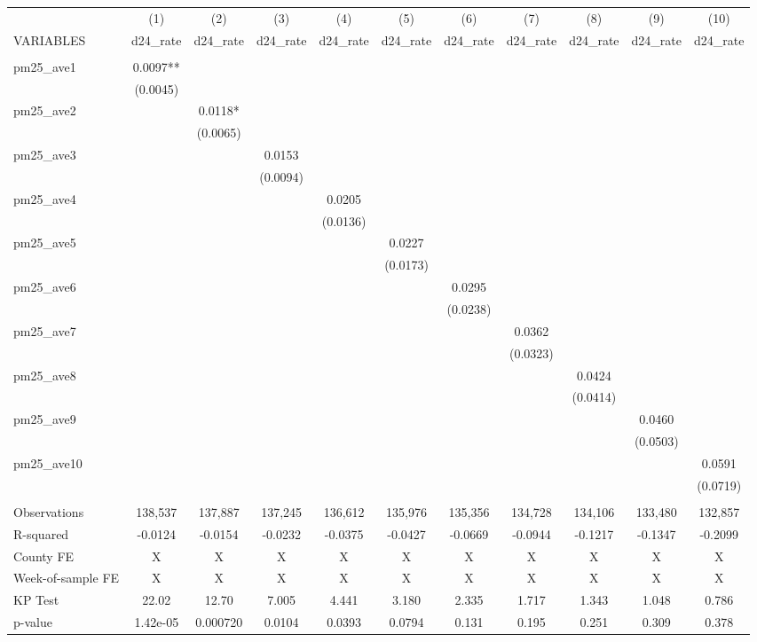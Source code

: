 \begin{tabular}{lcccccccccc} \hline
 & (1) & (2) & (3) & (4) & (5) & (6) & (7) & (8) & (9) & (10) \\
VARIABLES & d24\_rate & d24\_rate & d24\_rate & d24\_rate & d24\_rate & d24\_rate & d24\_rate & d24\_rate & d24\_rate & d24\_rate \\ \hline
 &  &  &  &  &  &  &  &  &  &  \\
pm25\_ave1 & 0.0097** &  &  &  &  &  &  &  &  &  \\
 & (0.0045) &  &  &  &  &  &  &  &  &  \\
pm25\_ave2 &  & 0.0118* &  &  &  &  &  &  &  &  \\
 &  & (0.0065) &  &  &  &  &  &  &  &  \\
pm25\_ave3 &  &  & 0.0153 &  &  &  &  &  &  &  \\
 &  &  & (0.0094) &  &  &  &  &  &  &  \\
pm25\_ave4 &  &  &  & 0.0205 &  &  &  &  &  &  \\
 &  &  &  & (0.0136) &  &  &  &  &  &  \\
pm25\_ave5 &  &  &  &  & 0.0227 &  &  &  &  &  \\
 &  &  &  &  & (0.0173) &  &  &  &  &  \\
pm25\_ave6 &  &  &  &  &  & 0.0295 &  &  &  &  \\
 &  &  &  &  &  & (0.0238) &  &  &  &  \\
pm25\_ave7 &  &  &  &  &  &  & 0.0362 &  &  &  \\
 &  &  &  &  &  &  & (0.0323) &  &  &  \\
pm25\_ave8 &  &  &  &  &  &  &  & 0.0424 &  &  \\
 &  &  &  &  &  &  &  & (0.0414) &  &  \\
pm25\_ave9 &  &  &  &  &  &  &  &  & 0.0460 &  \\
 &  &  &  &  &  &  &  &  & (0.0503) &  \\
pm25\_ave10 &  &  &  &  &  &  &  &  &  & 0.0591 \\
 &  &  &  &  &  &  &  &  &  & (0.0719) \\
 &  &  &  &  &  &  &  &  &  &  \\
Observations & 138,537 & 137,887 & 137,245 & 136,612 & 135,976 & 135,356 & 134,728 & 134,106 & 133,480 & 132,857 \\
R-squared & -0.0124 & -0.0154 & -0.0232 & -0.0375 & -0.0427 & -0.0669 & -0.0944 & -0.1217 & -0.1347 & -0.2099 \\
County FE & X & X & X & X & X & X & X & X & X & X \\
Week-of-sample FE & X & X & X & X & X & X & X & X & X & X \\
KP Test & 22.02 & 12.70 & 7.005 & 4.441 & 3.180 & 2.335 & 1.717 & 1.343 & 1.048 & 0.786 \\
 p-value & 1.42e-05 & 0.000720 & 0.0104 & 0.0393 & 0.0794 & 0.131 & 0.195 & 0.251 & 0.309 & 0.378 \\ \hline
\end{tabular}
